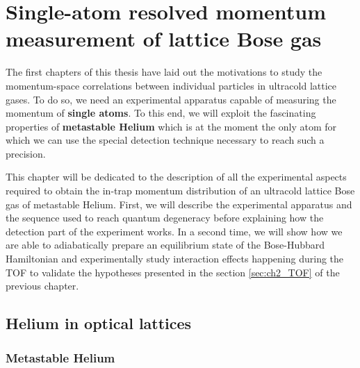 
\chapter{Single-atom resolved momentum measurement of lattice Bose gas}

\label{sec:chapter_3}

The first chapters of this thesis have laid out the motivations to study the momentum-space correlations between individual particles in ultracold lattice gases. To do so, we need an experimental apparatus capable of measuring the momentum of \textbf{single atoms}. To this end, we will exploit the fascinating properties of \textbf{metastable Helium} which is at the moment the only atom for which we can use the special detection technique necessary to reach such a precision.

This chapter will be dedicated to the description of all the experimental aspects required to obtain the in-trap momentum distribution of an ultracold lattice Bose gas of metastable Helium. First, we will describe the experimental apparatus and the sequence used to reach quantum degeneracy before explaining how the detection part of the experiment works. In a second time, we will show how we are able to adiabatically prepare an equilibrium state of the Bose-Hubbard Hamiltonian and experimentally study interaction effects happening during the TOF to validate the hypotheses presented in the section \ref{sec:ch2_TOF} of the previous chapter.




\section{Helium in optical lattices}

\subsection{Metastable Helium}


